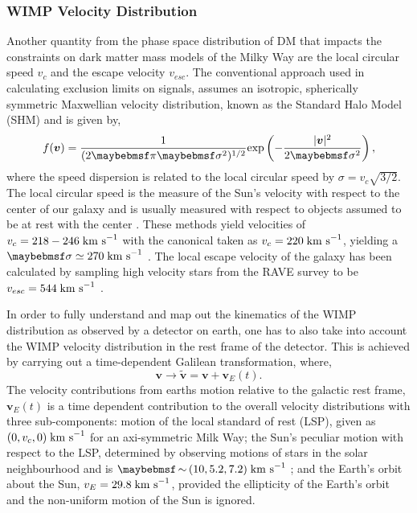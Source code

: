\subsubsection{WIMP Velocity Distribution}
\label{subsec:WIMP_velocity}

Another quantity from the phase space distribution of DM that impacts the constraints on dark matter mass models of the Milky Way are the local circular speed $v_{c}$ and the escape velocity $v_{esc}$. The conventional approach used in calculating exclusion limits on signals, assumes an isotropic, spherically symmetric Maxwellian velocity distribution, known as the Standard Halo Model (SHM) and is given by,
%
\begin{equation} \label{eq:dm_velocity_distribution}
    f(\boldsymbol{v}) = \frac{1}{(2\pi{}\sigma^{2})^{1/2}} \MathText{exp} \left( -\frac{|\boldsymbol{v}|^{2}}{2\sigma{}^2} \right),
\end{equation}
%
where the speed dispersion is related to the local circular speed by $\sigma = v_{c}\sqrt{3/2}$. The local circular speed is the measure of the Sun's velocity with respect to the center of our galaxy and is usually measured with respect to objects assumed to be at rest with the center \cite{Bovy_2012}. These methods yield velocities of $v_{c} = 218-246 \; \text{km s}^{-1}$ with the canonical taken as $v_{c} = 220 \; \text{km s}^{-1}$, yielding a $\sigma \simeq 270 \; \MathText{km s}^{-1}$ \cite{canonical_speed}. The local escape velocity of the galaxy has been calculated by sampling high velocity stars from the RAVE survey to be $v_{esc} = 544 \; \text{km s}^{-1}$ \cite{Smith_2007}.

In order to fully understand and map out the kinematics of the WIMP distribution as observed by a detector on earth, one has to also take into account the WIMP velocity distribution in the rest frame of the detector. This is achieved by carrying out a time-dependent Galilean transformation, where, 
%
\begin{equation} \label{eq:dm_velocity_distribution}
    \boldsymbol{v} \rightarrow \boldsymbol{\tilde{v}} = \boldsymbol{v} + \boldsymbol{v}_{E}(t).
\end{equation}
%
The velocity contributions from earths motion relative to the galactic rest frame, $\boldsymbol{v}_{E}(t)$ is a time dependent contribution to the overall velocity distributions with three sub-components: motion of the local standard of rest (LSP), given as $(0,v_{c},0) \; \text{km s}^{-1}$ for an axi-symmetric Milk Way; the Sun's peculiar motion with respect to the LSP, determined by observing motions of stars in the solar neighbourhood and is $\sim(10, 5.2, 7.2) \; \MathText{km s}^{-1}$ \cite{Dehnen_1998}; and the Earth's orbit about the Sun, $v_{E} = 29.8 \; \text{km s}^{-1}$, provided the ellipticity of the Earth's orbit and the non-uniform motion of the Sun is ignored.

